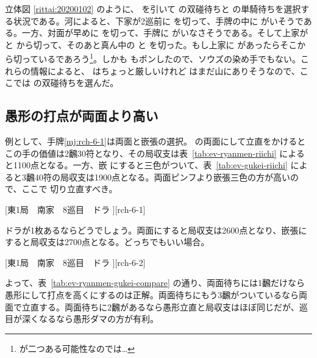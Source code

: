 \documentclass[10pt, twocolumn]{article}
\newlength\stdbls %
\newcommand{\mjfn}[1]{\raisebox{-.135\stdbls}{\mahjong[0.75\stdbls]{#1}}}
\begin{document}
立体図 \ref{rittai:20200102} のように、 を引いて  の双碰待ちと  の単騎待ちを選択する状況である。河によると、下家が2巡前に  を切って、手牌の中に  がいそうである。一方、対面が早めに  を切って、手牌に  がいなさそうである。そして上家が  と  から切って、そのあと真ん中の  と  を切った。もし上家に  があったらそこから切っているであろう\footnote{\mjfn{1s} が二つある可能性なのでは…}。しかも  もポンしたので、ソウズの染め手でもない。これらの情報によると、 はちょっと厳しいけれど  はまだ山にありそうなので、ここで\citet[p.~58]{muhai}は  の双碰待ちを選んだ。

\subsection{愚形の打点が両面より高い}

例として、手牌\ref{mj:rch-6-1}は両面と嵌張の選択。 の両面にして立直をかけるとこの手の価値は2飜30符となり、その局収支は表~\ref{tab:ev-ryanmen-riichi} によると1100点となる。一方、嵌  にすると三色がついて、表~\ref{tab:ev-gukei-riichi} によると3飜40符の局収支は1900点となる。両面ピンフより嵌張三色の方が高いので、ここで  切り立直すべき\citep[][p. 55]{miinin-stat}。

[東1局　南家　8巡目　ドラ ][rch-6-1]

ドラが1枚あるならどうでしょう。両面にすると局収支は2600点となり、嵌張にすると局収支は2700点となる。どっちでもいい場合\citep[][p. 56]{miinin-stat}。

[東1局　南家　8巡目　ドラ ][rch-6-2]

よって、表~\ref{tab:ev-ryanmen-gukei-compare} の通り、両面待ちには1飜だけなら愚形にして打点を高くにするのは正解。両面待ちにもう3飜がついているなら両面で立直する。両面待ちに2飜があるなら愚形立直と局収支はほぼ同じだが、巡目が深くなるなら愚形ダマの方が有利。
\end{document}
